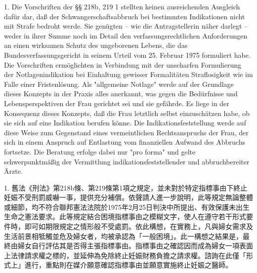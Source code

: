 \documentclass[12pt]{article}
\begin{document}
\begin{sourcepara}[title={原文理由 B.I.1}]
1. Die Vorschriften der §§ 218b, 219 \abbrAbs{} 1 \abbrStGB{} \abbrAF{} stellten keinen ausreichenden Ausgleich dafür dar, daß der Schwangerschaftsabbruch bei bestimmten Indikationen nicht mit Strafe bedroht werde. Sie genügten -- wie die Antragstellerin näher darlegt -- weder in ihrer Summe noch im Detail den verfassungsrechtlichen Anforderungen an einen wirksamen Schutz des ungeborenen Lebens, die das Bundesverfassungsgericht in seinem Urteil vom 25. Februar 1975 formuliert habe. Die Vorschriften ermöglichten in Verbindung mit der unscharfen Formulierung der Notlagenindikation bei Einhaltung gewisser Formalitäten Straflosigkeit wie im Falle einer Fristenlösung. Als "allgemeine Notlage" werde auf der Grundlage dieses Konzepts in der Praxis alles anerkannt, was gegen die Bedürfnisse und Lebensperspektiven der Frau gerichtet sei und sie gefährde. Es liege in der Konsequenz dieses Konzepts, daß die Frau letztlich selbst einzuschätzen habe, ob sie sich auf eine Indikation berufen könne. Die Indikationsfeststellung werde auf diese Weise zum Gegenstand eines vermeintlichen Rechtsanspruchs der Frau, der sich in einem Anspruch auf Entlastung vom finanziellen Aufwand des Abbruchs fortsetze. Die Beratung erfolge dabei nur "pro forma" und gelte schwerpunktmäßig der Vermittlung indikationsfeststellender und abbruchbereiter Ärzte.
\end{sourcepara}
\begin{transpara}
1. 舊法《刑法》第218b條、第219條第1項之規定，並未對於特定指標事由下終止妊娠不受刑罰威嚇一事，提供充分補償。依聲請人進一步說明，此等規定無論整體或細節，均不符合聯邦憲法法院於1975年2月25日判決中所提出、有效保護未出生生命之憲法要求。此等規定結合困境指標事由之模糊文字，使人在遵守若干形式要件時，即可如期限規定之情形般不受處罰。依此構想，在實務上，凡與婦女需求及生活前景相牴觸並危及婦女者，均被承認為「一般困境」。此一構想之結果是，最終由婦女自行評估其是否得主張指標事由。指標事由之確認因而成為婦女一項表面上法律請求權之標的，並延伸為免除終止妊娠財務負擔之請求權。諮詢在此僅「形式上」進行，重點則在媒介願意確認指標事由並願意實施終止妊娠之醫師。
\end{transpara}
\end{document}
